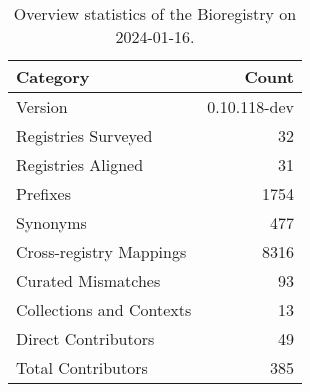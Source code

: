 \begin{table}
\caption{Overview statistics of the Bioregistry on 2024-01-16.}
\label{tab:bioregistry-summary}
\begin{tabular}{lr}
\toprule
Category & Count \\
\midrule
Version & 0.10.118-dev \\
Registries Surveyed & 32 \\
Registries Aligned & 31 \\
Prefixes & 1754 \\
Synonyms & 477 \\
Cross-registry Mappings & 8316 \\
Curated Mismatches & 93 \\
Collections and Contexts & 13 \\
Direct Contributors & 49 \\
Total Contributors & 385 \\
\bottomrule
\end{tabular}
\end{table}
